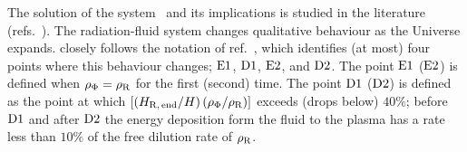 \documentclass[11pt,a4paper]{article}
\begin{document}
The solution of the system~ and its implications is studied in the literature (\eg refs.~\cite{Vilenkin:1982wt,Coughlan:1983ci,Ratra:1987rm,McDonald:1989jd,Giudice:2000ex,Gardner:2004in,DEramo:2017gpl,Redmond:2017tja,DEramo:2017ecx,Dalianis:2018afb,Hardy:2018bph,Bernal:2018kcw,Arias:2019uol,Allahverdi:2019jsc,Bernal:2019mhf,Cosme:2020mck,Bernal:2020bfj,Arias:2020qty,Arias:2021rer,Barman:2021ifu,Dienes:2021woi,Banerjee:2022fiw}). The radiation-fluid system changes qualitative behaviour as the Universe expands. \nsc closely follows the notation of ref.~\cite{Arias:2020qty}, which identifies (at most) four points where this behaviour changes; ${\rm E1}{}$, ${\rm D1}{}$, ${\rm E2}{}$, and ${\rm D2}{}$. The point ${\rm E1}{}$ (${\rm E2}{}$) is defined when $\rho_{\Phi}=\rho_{\rm R}$ for the first (second) time. The point ${\rm D1}{}$ (${\rm D2}{}$) is defined as the point at which $\left[  (H_{\rm R,\,end}/H) \, (\rho_{\Phi}/\rho_{\rm R})  \right]$ exceeds (drops below) $40\%$; \ie before ${\rm D1}{}$ and after ${\rm D2}{}$ the energy deposition form the fluid to the plasma has a rate less than $10\%$ of the free dilution rate of $\rho_{\rm R}$.
\end{document}
